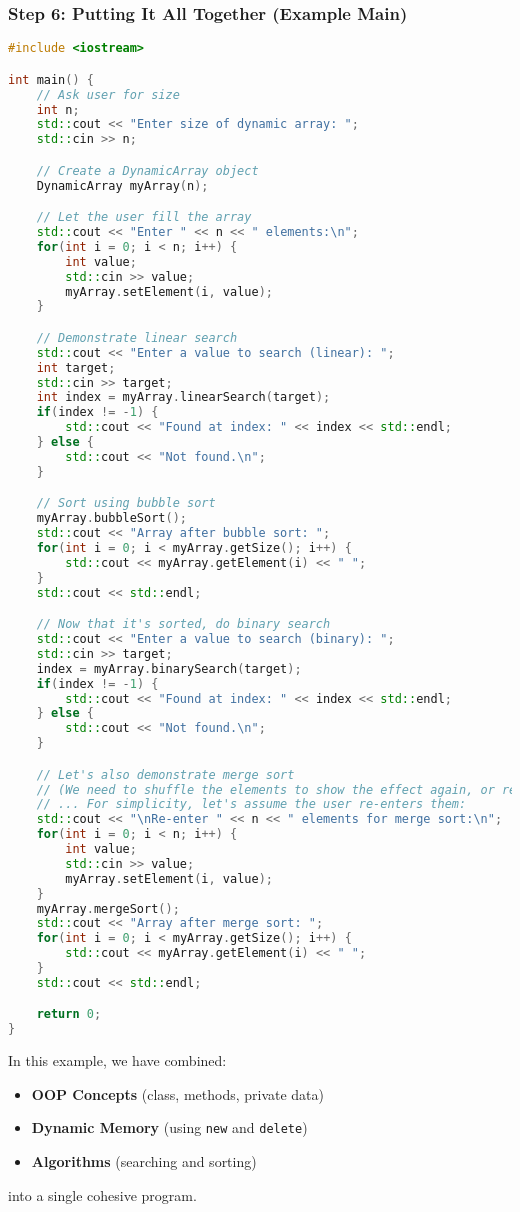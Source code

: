 \documentclass[a4paper,12pt]{article}
\begin{document}
\subsubsection*{Step 6: Putting It All Together (Example Main)}
\begin{lstlisting}[language=C++]
#include <iostream>

int main() {
    // Ask user for size
    int n;
    std::cout << "Enter size of dynamic array: ";
    std::cin >> n;

    // Create a DynamicArray object
    DynamicArray myArray(n);

    // Let the user fill the array
    std::cout << "Enter " << n << " elements:\n";
    for(int i = 0; i < n; i++) {
        int value;
        std::cin >> value;
        myArray.setElement(i, value);
    }

    // Demonstrate linear search
    std::cout << "Enter a value to search (linear): ";
    int target;
    std::cin >> target;
    int index = myArray.linearSearch(target);
    if(index != -1) {
        std::cout << "Found at index: " << index << std::endl;
    } else {
        std::cout << "Not found.\n";
    }

    // Sort using bubble sort
    myArray.bubbleSort();
    std::cout << "Array after bubble sort: ";
    for(int i = 0; i < myArray.getSize(); i++) {
        std::cout << myArray.getElement(i) << " ";
    }
    std::cout << std::endl;

    // Now that it's sorted, do binary search
    std::cout << "Enter a value to search (binary): ";
    std::cin >> target;
    index = myArray.binarySearch(target);
    if(index != -1) {
        std::cout << "Found at index: " << index << std::endl;
    } else {
        std::cout << "Not found.\n";
    }

    // Let's also demonstrate merge sort
    // (We need to shuffle the elements to show the effect again, or re-input them)
    // ... For simplicity, let's assume the user re-enters them:
    std::cout << "\nRe-enter " << n << " elements for merge sort:\n";
    for(int i = 0; i < n; i++) {
        int value;
        std::cin >> value;
        myArray.setElement(i, value);
    }
    myArray.mergeSort();
    std::cout << "Array after merge sort: ";
    for(int i = 0; i < myArray.getSize(); i++) {
        std::cout << myArray.getElement(i) << " ";
    }
    std::cout << std::endl;

    return 0;
}
\end{lstlisting}

\noindent
In this example, we have combined:
\begin{itemize}
    \item \textbf{OOP Concepts} (class, methods, private data)
    \item \textbf{Dynamic Memory} (using \texttt{new} and \texttt{delete})
    \item \textbf{Algorithms} (searching and sorting)
\end{itemize}
into a single cohesive program.
\end{document}
